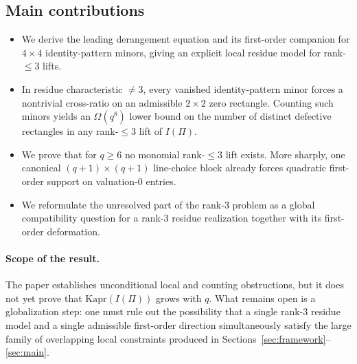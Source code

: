 \documentclass[11pt]{amsart}
\numberwithin{equation}{section}
\theoremstyle{plain}
\theoremstyle{definition}
\theoremstyle{remark}
\newcommand{\Kapr}{\mathrm{Kapr}}
\begin{document}

\subsection{Main contributions}
\begin{itemize}[leftmargin=2em]
  \item We derive the leading derangement equation and its first-order companion for $4\times4$ identity-pattern minors, giving an explicit local residue model for rank-$\le 3$ lifts.
  \item In residue characteristic $\neq 3$, every vanished identity-pattern minor forces a nontrivial cross-ratio on an admissible $2\times2$ zero rectangle. Counting such minors yields an $\Omega(q^8)$ lower bound on the number of distinct defective rectangles in any rank-$\le 3$ lift of $I(\Pi)$.
  \item We prove that for $q\ge 6$ no monomial rank-$\le 3$ lift exists. More sharply, one canonical $(q+1)\times(q+1)$ line-choice block already forces quadratic first-order support on valuation-$0$ entries.
  \item We reformulate the unresolved part of the rank-$3$ problem as a global compatibility question for a rank-$3$ residue realization together with its first-order deformation.
\end{itemize}

\paragraph{Scope of the result.}
The paper establishes unconditional local and counting obstructions, but it does not yet prove that $\Kapr(I(\Pi))$ grows with $q$. What remains open is a globalization step: one must rule out the possibility that a single rank-$3$ residue model and a single admissible first-order direction simultaneously satisfy the large family of overlapping local constraints produced in Sections~\ref{sec:framework}--\ref{sec:main}.
\end{document}
